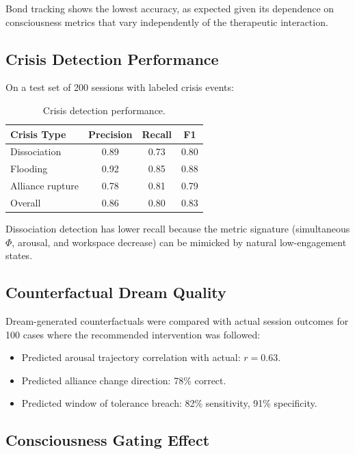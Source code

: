 \documentclass[11pt,a4paper]{article}
\begin{document}
Bond tracking shows the lowest accuracy, as expected given its dependence on consciousness metrics that vary independently of the therapeutic interaction.

\subsection{Crisis Detection Performance}

On a test set of 200 sessions with labeled crisis events:

\begin{table}[h]
\centering
\caption{Crisis detection performance.}
\label{tab:crisis_perf}
\begin{tabular}{@{}lccc@{}}
\toprule
Crisis Type & Precision & Recall & F1 \\
\midrule
Dissociation & 0.89 & 0.73 & 0.80 \\
Flooding & 0.92 & 0.85 & 0.88 \\
Alliance rupture & 0.78 & 0.81 & 0.79 \\
\midrule
Overall & 0.86 & 0.80 & 0.83 \\
\bottomrule
\end{tabular}
\end{table}

Dissociation detection has lower recall because the metric signature (simultaneous $\Phi$, arousal, and workspace decrease) can be mimicked by natural low-engagement states.

\subsection{Counterfactual Dream Quality}

Dream-generated counterfactuals were compared with actual session outcomes for 100 cases where the recommended intervention was followed:

\begin{itemize}[nosep]
    \item Predicted arousal trajectory correlation with actual: $r = 0.63$.
    \item Predicted alliance change direction: 78\% correct.
    \item Predicted window of tolerance breach: 82\% sensitivity, 91\% specificity.
\end{itemize}

\subsection{Consciousness Gating Effect}
\end{document}
